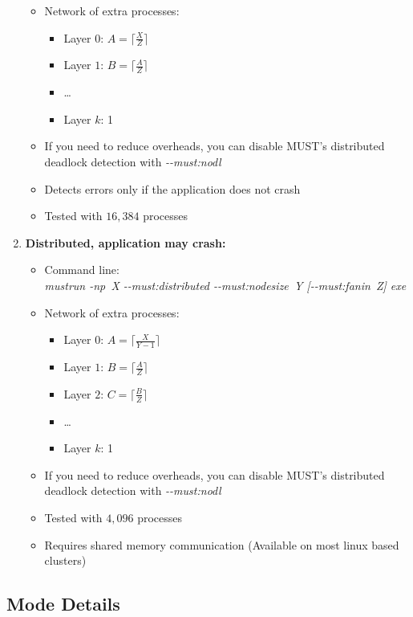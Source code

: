 \documentclass[english]{scrartcl}
\begin{document}
\begin{enumerate}
\begin{itemize}
    \item Network of extra processes:
    \begin{itemize}
      \item Layer $0$: $A=\lceil{}\frac{X}{Z}\rceil{}$
      \item Layer $1$: $B=\lceil{}\frac{A}{Z}\rceil{}$
      \item \ldots
      \item Layer $k$: 1
    \end{itemize}
    \item If you need to reduce overheads, you can disable MUST's distributed deadlock detection with \emph{\mbox{-{}-must:nodl}}
    \item Detects errors only if the application does not crash %
    \item Tested with $16,384$ processes 
  \end{itemize}
  \item \textbf{Distributed, application may crash:}
  \begin{itemize}
    \item Command line: \\\emph{mustrun \mbox{-np X} \mbox{-{}-must:distributed} \mbox{-{}-must:nodesize Y} [\mbox{-{}-must:fanin Z}] exe}
    \item Network of extra processes:
    \begin{itemize}
      \item Layer $0$: $A=\lceil{}\frac{X}{Y-1}\rceil{}$
      \item Layer $1$: $B=\lceil{}\frac{A}{Z}\rceil{}$
      \item Layer $2$: $C=\lceil{}\frac{B}{Z}\rceil{}$
      \item \ldots
      \item Layer $k$: 1
    \end{itemize}
    \item If you need to reduce overheads, you can disable MUST's distributed deadlock detection with \emph{\mbox{-{}-must:nodl}}
    \item Tested with $4,096$ processes 
    \item Requires shared memory communication (Available on most linux based clusters)
  \end{itemize}
\end{enumerate} 

\subsection{Mode Details}
\end{document}
